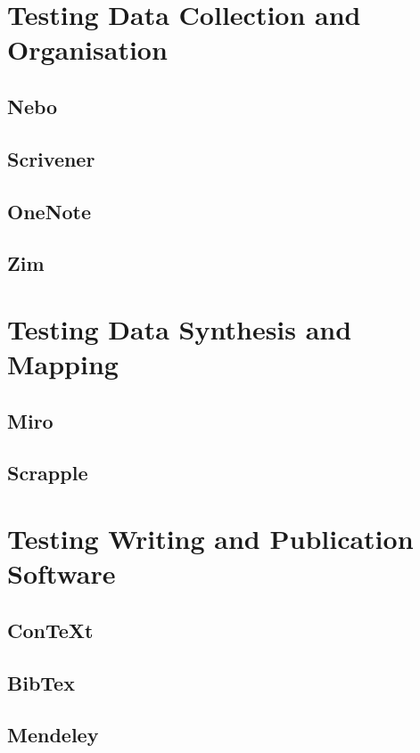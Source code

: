 \documentclass{article}
\begin{document}
\section {Testing Data Collection and Organisation}
\subsection{Nebo}
\subsection{Scrivener}
\subsection{OneNote}
\subsection{Zim}

\section{Testing Data Synthesis and Mapping}
\subsection{Miro}
\subsection{Scrapple}

\section{Testing Writing and Publication Software}
\subsection{ConTeXt}
\subsection{BibTex}
\subsection{Mendeley}
\end{document}
